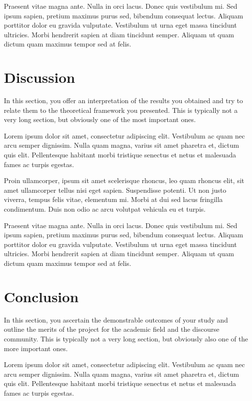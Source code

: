 \documentclass[12pt,a4paper]{report}
\newcommand{\daechapter}[1]{
  \chapter*{#1} %
  \addcontentsline{toc}{chapter}{#1} %
}
\begin{document}
Praesent vitae magna ante. Nulla in orci lacus. Donec quis vestibulum mi. Sed ipsum sapien, pretium maximus purus sed, bibendum consequat lectus. Aliquam porttitor dolor eu gravida vulputate. Vestibulum ut urna eget massa tincidunt ultricies. Morbi hendrerit sapien at diam tincidunt semper. Aliquam ut quam dictum quam maximus tempor sed at felis.

\daechapter{Discussion}

\begin{ybox}
In this section, you offer an interpretation of the results you obtained and try to relate them to the theoretical framework you presented. This is typically not a very long section, but obviously one of the most important ones.
\end{ybox}

Lorem ipsum dolor sit amet, consectetur adipiscing elit. Vestibulum ac quam nec arcu semper dignissim. Nulla quam magna, varius sit amet pharetra et, dictum quis elit. Pellentesque habitant morbi tristique senectus et netus et malesuada fames ac turpis egestas.

Proin ullamcorper, ipsum sit amet scelerisque rhoncus, leo quam rhoncus elit, sit amet ullamcorper tellus nisi eget sapien. Suspendisse potenti. Ut non justo viverra, tempus felis vitae, elementum mi. Morbi at dui sed lacus fringilla condimentum. Duis non odio ac arcu volutpat vehicula eu et turpis.

Praesent vitae magna ante. Nulla in orci lacus. Donec quis vestibulum mi. Sed ipsum sapien, pretium maximus purus sed, bibendum consequat lectus. Aliquam porttitor dolor eu gravida vulputate. Vestibulum ut urna eget massa tincidunt ultricies. Morbi hendrerit sapien at diam tincidunt semper. Aliquam ut quam dictum quam maximus tempor sed at felis.

\daechapter{Conclusion}

\begin{ybox}
In this section, you ascertain the demonstrable outcomes of your study and outline the merits of the project for the academic field and the discourse community. This is typically not a very long section, but obviously also one of the more important ones.
\end{ybox}

Lorem ipsum dolor sit amet, consectetur adipiscing elit. Vestibulum ac quam nec arcu semper dignissim. Nulla quam magna, varius sit amet pharetra et, dictum quis elit. Pellentesque habitant morbi tristique senectus et netus et malesuada fames ac turpis egestas.
\end{document}
